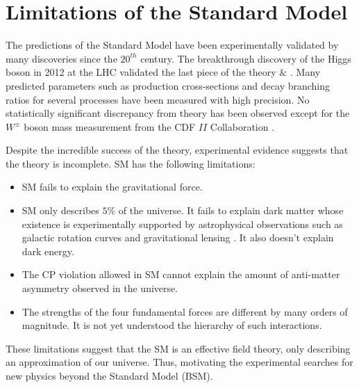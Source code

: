 \section{Limitations of the Standard Model}	
\label{sec:SM_Incomplete}

The predictions of the Standard Model have been experimentally validated by many discoveries since the $20^{th}$ century. The breakthrough discovery of the Higgs boson in 2012 at the LHC validated the last piece of the theory \cite{CMSHiggsDiscovery}$\&$ \cite{ATLASHiggsDiscovery}. Many predicted parameters such as production cross-sections and decay branching ratios for several processes have been measured with high precision. No statistically significant discrepancy from theory has been observed except for the $W^{\pm}$ boson mass measurement from the CDF $II$ Collaboration \cite{CDFWMass}.

Despite the incredible success of the theory, experimental evidence suggests that the theory is incomplete. SM has the following limitations:

\begin{itemize}

\item{SM fails to explain the gravitational force.}

\item{SM only describes $5\%$ of the universe. It fails to explain dark matter whose existence is experimentally supported by astrophysical observations such as galactic rotation curves and gravitational lensing \cite{DMGravitationalLensing}. It also doesn't explain dark energy. }

\item{The CP violation allowed in SM cannot explain the amount of anti-matter asymmetry observed in the universe. }

\item{ The strengths of the four fundamental forces are different by many orders of magnitude. It is not yet understood the hierarchy of such interactions.}
\end{itemize}
 
These limitations suggest that the SM is an effective field theory, only describing an approximation of our universe. Thus, motivating the experimental searches for new physics beyond the Standard Model (BSM).
